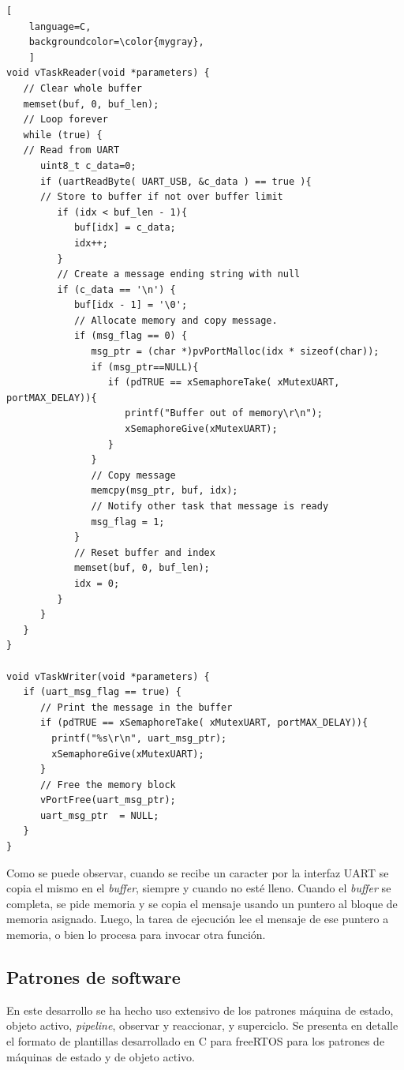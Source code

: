 \begin{lstlisting}[
	language=C, 
	backgroundcolor=\color{mygray},
	]
void vTaskReader(void *parameters) {
   // Clear whole buffer
   memset(buf, 0, buf_len);
   // Loop forever
   while (true) {
   // Read from UART
      uint8_t c_data=0;
      if (uartReadByte( UART_USB, &c_data ) == true ){
      // Store to buffer if not over buffer limit  
         if (idx < buf_len - 1){
            buf[idx] = c_data;
            idx++;
         }
         // Create a message ending string with null
         if (c_data == '\n') {
            buf[idx - 1] = '\0';
            // Allocate memory and copy message. 
            if (msg_flag == 0) {
               msg_ptr = (char *)pvPortMalloc(idx * sizeof(char));
               if (msg_ptr==NULL){
                  if (pdTRUE == xSemaphoreTake( xMutexUART, portMAX_DELAY)){
                     printf("Buffer out of memory\r\n");
                     xSemaphoreGive(xMutexUART);
                  }
               }
               // Copy message
               memcpy(msg_ptr, buf, idx);
               // Notify other task that message is ready
               msg_flag = 1;
            }
            // Reset buffer and index
            memset(buf, 0, buf_len);
            idx = 0;
         }
      }
   }
}     

void vTaskWriter(void *parameters) {
   if (uart_msg_flag == true) {
      // Print the message in the buffer 
      if (pdTRUE == xSemaphoreTake( xMutexUART, portMAX_DELAY)){
        printf("%s\r\n", uart_msg_ptr);
        xSemaphoreGive(xMutexUART);
      }
      // Free the memory block  
      vPortFree(uart_msg_ptr);  
      uart_msg_ptr  = NULL;
   }
}

\end{lstlisting}

Como se puede observar, cuando se recibe un caracter por la interfaz UART se copia el mismo en el \textit{buffer}, siempre y cuando no esté lleno. Cuando el \textit{buffer} se completa, se pide memoria y se copia el mensaje usando un puntero al bloque de memoria asignado. Luego, la tarea de ejecución lee el mensaje de ese puntero a memoria, o bien lo procesa para invocar otra función.\\


\subsection{Patrones de software}
En este desarrollo se ha hecho uso extensivo de los patrones máquina de estado, objeto activo, \textit{pipeline}, observar y reaccionar, y superciclo. Se presenta en detalle el formato de plantillas desarrollado en C para freeRTOS para los patrones de máquinas de estado y de objeto activo. \\

